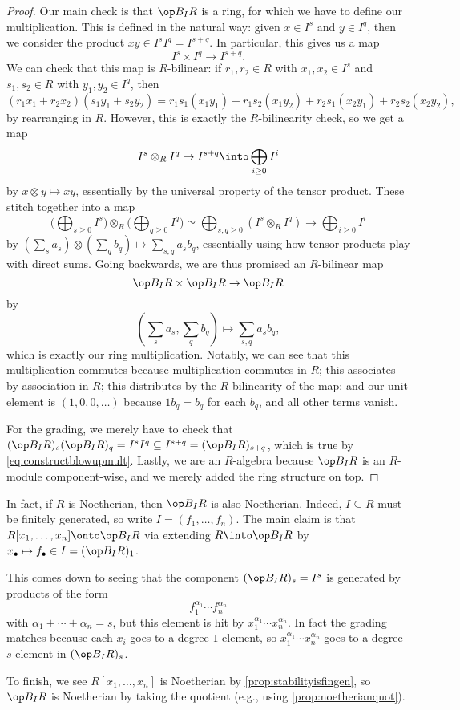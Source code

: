 \begin{proof}
	Our main check is that $\op B_IR$ is a ring, for which we have to define our multiplication. This is defined in the natural way: given $x\in I^s$ and $y\in I^q$, then we consider the product $xy\in I^sI^q=I^{s+q}$. In particular, this gives us a map
	\[I^s\times I^q\to I^{s+q}. \tag{$*$}\label{eq:constructblowupmult}\]
	We can check that this map is $R$-bilinear: if $r_1,r_2\in R$ with $x_1,x_2\in I^s$ and $s_1,s_2\in R$ with $y_1,y_2\in I^q$, then
	\[(r_1x_1+r_2x_2)(s_1y_1+s_2y_2)=r_1s_1(x_1y_1)+r_1s_2(x_1y_2)+r_2s_1(x_2y_1)+r_2s_2(x_2y_2),\]
	by rearranging in $R$. However, this is exactly the $R$-bilinearity check, so we get a map
	\[I^s\otimes_RI^q\to I^{s+q}\into\bigoplus_{i\ge0}I^i\]
	by $x\otimes y\mapsto xy$, essentially by the universal property of the tensor product. These stitch together into a map
	\[\Bigg(\bigoplus_{s\ge0}I^s\Bigg)\otimes_R\Bigg(\bigoplus_{q\ge0}I^q\Bigg)\simeq\bigoplus_{s,q\ge0}\left(I^s\otimes_R I^q\right)\to\bigoplus_{i\ge0}I^i\]
	by $\left(\sum_sa_s\right)\otimes\left(\sum_qb_q\right)\mapsto\sum_{s,q}a_sb_q$, essentially using how tensor products play with direct sums. Going backwards, we are thus promised an $R$-bilinear map
	\[\op B_IR\times\op B_IR\to\op B_IR\]
	by
	\[\left(\sum_sa_s,\sum_qb_q\right)\mapsto\sum_{s,q}a_sb_q,\]
	which is exactly our ring multiplication. Notably, we can see that this multiplication commutes because multiplication commutes in $R$; this associates by association in $R$; this distributes by the $R$-bilinearity of the map; and our unit element is $(1,0,0,\ldots)$ because $1b_q=b_q$ for each $b_q$, and all other terms vanish.

	For the grading, we merely have to check that $(\op B_IR)_s(\op B_IR)_q=I^sI^q\subseteq I^{s+q}=(\op B_IR)_{s+q}$, which is true by \autoref{eq:constructblowupmult}. Lastly, we are an $R$-algebra because $\op B_IR$ is an $R$-module component-wise, and we merely added the ring structure on top.
\end{proof}
\begin{remark}[Nir] \label{rem:blowupnoetherian}
	In fact, if $R$ is Noetherian, then $\op B_IR$ is also Noetherian. Indeed, $I\subseteq R$ must be finitely generated, so write $I=(f_1,\ldots,f_n)$. The main claim is that $R[x_1,\ldots,x_n]\onto\op B_IR$ via extending $R\into\op B_IR$ by $x_\bullet\mapsto f_\bullet\in I=(\op B_IR)_1$.
	
	This comes down to seeing that the component $(\op B_IR)_s=I^s$ is generated by products of the form
	\[f_1^{\alpha_1}\cdots f_n^{\alpha_n}\]
	with $\alpha_1+\cdots+\alpha_n=s$, but this element is hit by $x_1^{\alpha_1}\cdots x_n^{\alpha_n}$. In fact the grading matches because each $x_i$ goes to a degree-$1$ element, so $x_1^{\alpha_1}\cdots x_n^{\alpha_n}$ goes to a degree-$s$ element in $(\op B_IR)_s$.

	To finish, we see $R[x_1,\ldots,x_n]$ is Noetherian by \autoref{prop:stabilityisfingen}, so $\op B_IR$ is Noetherian by taking the quotient (e.g., using \autoref{prop:noetherianquot}).
\end{remark}
